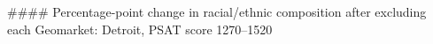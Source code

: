 #### Percentage-point change in racial/ethnic composition after excluding each Geomarket: Detroit, PSAT score 1270–1520
